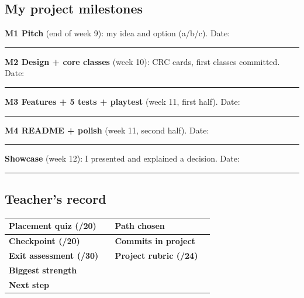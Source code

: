 \documentclass[level=3]{kidscode}
\begin{document}
\subsection{My project milestones}
\begin{checklist}
  \item \textbf{M1 Pitch} (end of week 9): my idea and option (a/b/c). \hfill Date: \rule{2.5cm}{0.4pt}
  \item \textbf{M2 Design + core classes} (week 10): CRC cards, first classes committed. \hfill Date: \rule{2.5cm}{0.4pt}
  \item \textbf{M3 Features + 5 tests + playtest} (week 11, first half). \hfill Date: \rule{2.5cm}{0.4pt}
  \item \textbf{M4 README + polish} (week 11, second half). \hfill Date: \rule{2.5cm}{0.4pt}
  \item \textbf{Showcase} (week 12): I presented and explained a decision. \hfill Date: \rule{2.5cm}{0.4pt}
\end{checklist}

\subsection{Teacher's record}
\renewcommand{\arraystretch}{1.4}
\begin{tabularx}{\linewidth}{@{}>{\bfseries}lX>{\bfseries}lX@{}}
\toprule
Placement quiz (/20) & & Path chosen & \\ \midrule
Checkpoint (/20) & & Commits in project & \\ \midrule
Exit assessment (/30) & & Project rubric (/24) & \\ \midrule
Biggest strength & \multicolumn{3}{l}{} \\ \midrule
Next step & \multicolumn{3}{l}{} \\
\bottomrule
\end{tabularx}
\end{document}
